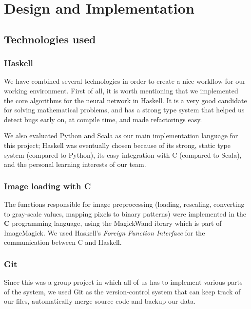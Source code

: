 \chapter{Design and Implementation}

\section{Technologies used}

\subsection*{Haskell}
We have combined several technologies in order to create a nice workflow for our working environment. First of all, it is worth mentioning that we implemented the core algorithms for the neural network in Haskell. It is a very good candidate for solving mathematical problems, and has a strong type system that helped us detect bugs early on, at compile time, and made refactorings easy.

We also evaluated Python and Scala as our main implementation language for this project; Haskell was eventually chosen because of its strong, static type system (compared to Python), its easy integration with C (compared to Scala), and the personal learning interests of our team.

\subsection*{Image loading with C}
The functions responsible for image preprocessing (loading, rescaling, converting to gray-scale values, mapping pixels to binary patterns) were implemented in the \textbf{C} programming language, using the MagickWand ibrary which is part of ImageMagick. We used Haskell's \textit{Foreign Function Interface} for the communication between C and Haskell.

\subsection*{Git}
Since this was a group project in which all of us has to implement various parts of the system, we used Git as the version-control system that can keep track of our files, automatically merge source code and backup our data.

